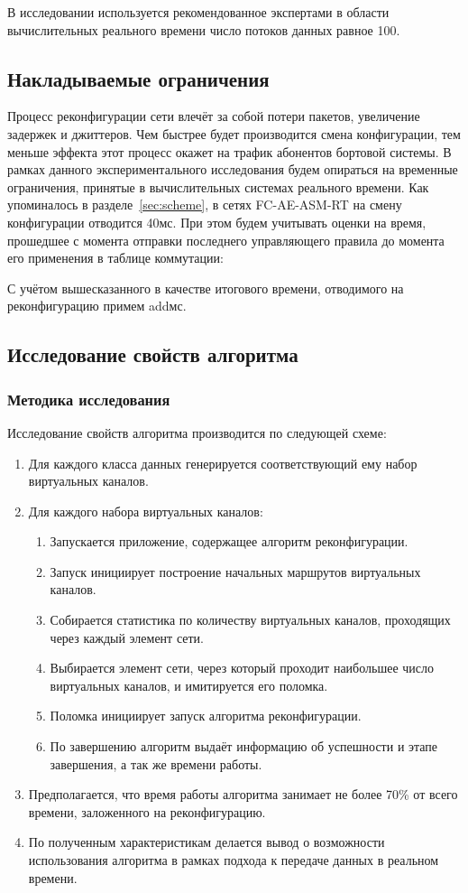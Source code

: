 \documentclass[12pt, a4paper]{article}
\begin{document}
В исследовании используется рекомендованное экспертами в области вычислительных реального времени число потоков данных равное 100.

\subsection{Накладываемые ограничения} \label{subsec:limits}
Процесс реконфигурации сети влечёт за собой потери пакетов, увеличение задержек и джиттеров. Чем быстрее будет производится смена конфигурации, тем меньше эффекта этот процесс окажет на трафик абонентов бортовой системы. В рамках данного экспериментального исследования будем опираться на временные ограничения, принятые в вычислительных системах реального времени. Как упоминалось в разделе~\ref{sec:scheme}, в сетях FC-AE-ASM-RT на смену конфигурации отводится 40мс. При этом будем учитывать оценки на время, прошедшее с момента отправки последнего управляющего правила до момента его применения в таблице коммутации:

С учётом вышесказанного в качестве итогового времени, отводимого на реконфигурацию примем addмс.
\subsection{Исследование свойств алгоритма}
\subsubsection{Методика исследования}
Исследование свойств алгоритма производится по следующей схеме:
\begin{enumerate}
	\item Для каждого класса данных генерируется соответствующий ему набор виртуальных каналов.
	\item Для каждого набора виртуальных каналов:
	\begin{enumerate}
		\item Запускается приложение, содержащее алгоритм реконфигурации.
		\item Запуск инициирует построение начальных маршрутов виртуальных каналов.
		\item Собирается статистика по количеству виртуальных каналов, проходящих через каждый элемент сети.
		\item Выбирается элемент сети, через который проходит наибольшее число виртуальных каналов, и имитируется его поломка.
		\item Поломка инициирует запуск алгоритма реконфигурации.
		\item По завершению алгоритм выдаёт информацию об успешности и этапе завершения, а так же времени работы.
	\end{enumerate}
	\item Предполагается, что время работы алгоритма занимает не более 70\% от всего времени, заложенного на реконфигурацию.
	\item По полученным характеристикам делается вывод о возможности использования алгоритма в рамках подхода к передаче данных в реальном времени.
\end{enumerate}
 
\end{document}
